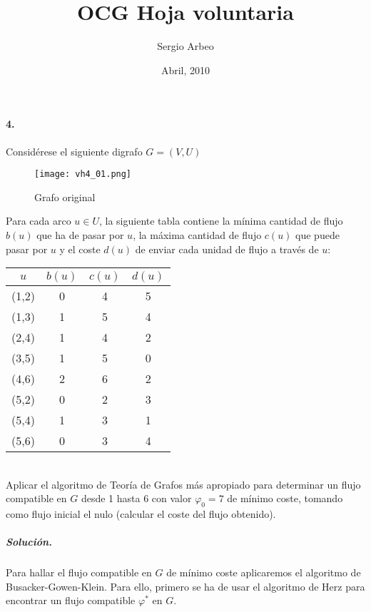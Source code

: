 \documentclass[12pt, oneside, a4paper]{article}
\begin{document}
\title{OCG Hoja voluntaria}\author{Sergio Arbeo}\date{Abril, 2010}\maketitle
\paragraph{4.}\label{ssub:1_} %
Considérese el siguiente digrafo $G=(V,U)$

\begin{figure}[h]
\centering
\texttt{[image: vh4\_01.png]}
\caption{Grafo original}
\label{fig:vh4-01}
\end{figure}

Para cada arco $u\in U$, la siguiente tabla contiene la mínima
cantidad de flujo $b(u)$ que ha de pasar por $u$, la máxima cantidad
de flujo $c(u)$ que puede pasar por $u$ y el coste $d(u)$ de enviar
cada unidad de flujo a través de $u$:\\


\begin{tabular}{| c | c | c | c |}
\hline
$u$   & $b(u)$ & $c(u)$ & $d(u)$ \\
\hline
(1,2) &   0    &   4    &   5    \\
(1,3) &   1    &   5    &   4    \\
(2,4) &   1    &   4    &   2    \\
(3,5) &   1    &   5    &   0    \\
(4,6) &   2    &   6    &   2    \\
(5,2) &   0    &   2    &   3    \\
(5,4) &   1    &   3    &   1    \\
(5,6) &   0    &   3    &   4    \\
\hline
\end{tabular}\\


Aplicar el algoritmo de Teoría de Grafos más apropiado para determinar
un flujo compatible en $G$ desde 1 hasta 6 con valor $\varphi_{0}=7$ de
mínimo coste, tomando como flujo inicial el nulo (calcular el coste
del flujo obtenido).

\subparagraph{Solución.\\}

Para hallar el flujo compatible en $G$ de mínimo coste aplicaremos el
algoritmo de Busacker-Gowen-Klein. Para ello, primero se ha de usar el algoritmo de
Herz para encontrar un flujo compatible $\varphi^*$ en $G$.
\end{document}
